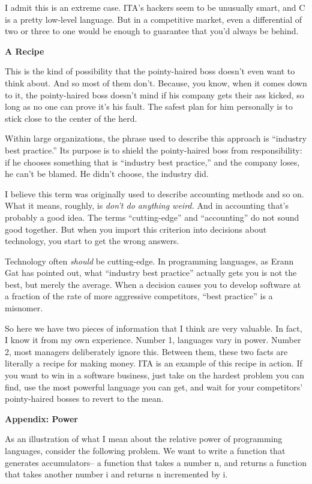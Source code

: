 \documentclass[12pt]{book}
\begin{document}
I admit this is an extreme case. ITA's hackers seem to be unusually
smart, and C is a pretty low-level language. But in a competitive
market, even a differential of two or three to one would be enough to
guarantee that you'd always be behind.

\textbf{A Recipe}

This is the kind of possibility that the pointy-haired boss doesn't even
want to think about. And so most of them don't. Because, you know, when
it comes down to it, the pointy-haired boss doesn't mind if his company
gets their ass kicked, so long as no one can prove it's his fault. The
safest plan for him personally is to stick close to the center of the
herd.

Within large organizations, the phrase used to describe this approach is
``industry best practice.'' Its purpose is to shield the pointy-haired
boss from responsibility: if he chooses something that is ``industry
best practice,'' and the company loses, he can't be blamed. He didn't
choose, the industry did.

I believe this term was originally used to describe accounting methods
and so on. What it means, roughly, is \emph{don't do anything weird.}
And in accounting that's probably a good idea. The terms
``cutting-edge'' and ``accounting'' do not sound good together. But when
you import this criterion into decisions about technology, you start to
get the wrong answers.

Technology often \emph{should} be cutting-edge. In programming
languages, as Erann Gat has pointed out, what ``industry best practice''
actually gets you is not the best, but merely the average. When a
decision causes you to develop software at a fraction of the rate of
more aggressive competitors, ``best practice'' is a misnomer.

So here we have two pieces of information that I think are very
valuable. In fact, I know it from my own experience. Number 1, languages
vary in power. Number 2, most managers deliberately ignore this. Between
them, these two facts are literally a recipe for making money. ITA is an
example of this recipe in action. If you want to win in a software
business, just take on the hardest problem you can find, use the most
powerful language you can get, and wait for your competitors'
pointy-haired bosses to revert to the mean.

\textbf{Appendix: Power}

As an illustration of what I mean about the relative power of
programming languages, consider the following problem. We want to write
a function that generates accumulators-- a function that takes a number
n, and returns a function that takes another number i and returns n
incremented by i.
\end{document}
